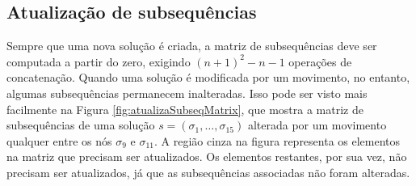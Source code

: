 \subsection{Atualização de subsequências}
Sempre que uma nova solução é criada, a matriz de subsequências deve ser computada a partir do zero, exigindo $(n+1)^2 - n - 1$ operações de concatenação. Quando uma solução é modificada por um movimento, no entanto, algumas subsequências permanecem inalteradas. Isso pode ser visto mais facilmente na Figura \ref{fig:atualizaSubseqMatrix}, que mostra a matriz de subsequências de uma solução $s = (\sigma_1, \dots, \sigma_{15})$ alterada por um movimento qualquer entre os nós $\sigma_9$ e $\sigma_{11}$. A região cinza na figura representa os elementos na matriz que precisam ser atualizados. Os elementos restantes, por sua vez, não precisam ser atualizados, já que as subsequências associadas não foram alteradas.

